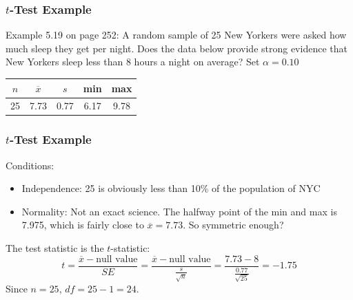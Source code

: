 \documentclass[handout]{beamer}
\newcommand{\blue}[1]{\textcolor{blue2}{#1}}
\newcommand{\xbar}{\overline{x}}
\begin{document}
\begin{frame}
\frametitle{$t$-Test Example}

Example 5.19 on page 252:  A random sample of 25 New Yorkers were asked how much sleep they get per night. Does the data below provide strong evidence that New Yorkers sleep less than 8 hours a night on average?  Set $\alpha=0.10$

\vspace{0.5cm}
\begin{center}
\begin{tabular}{c|c|c|c|c}
$n$ & $\xbar$ & $s$ & min & max\\
\hline
25 & 7.73 & 0.77 & 6.17 & 9.78\\
\end{tabular}
\end{center}

\end{frame}


\begin{frame}
\frametitle{$t$-Test Example}
%
%
Conditions:
\begin{itemize}
\item \blue{Independence}: 25 is obviously less than 10\% of the population of NYC
\item \blue{Normality}: Not an exact science.  The halfway point of the min and max is 7.975, which is fairly close to $\xbar=7.73$.  So symmetric enough? 
\end{itemize}

\vspace{0.25cm}

The test statistic is the $t$-statistic:
\[
t = \frac{\overline{x}-\mbox{null value}}{SE} = \frac{\overline{x}-\mbox{null value}}{\frac{s}{\sqrt n}} = \frac{7.73 - 8}{\frac{0.77}{\sqrt{25}}} = -1.75
\]
Since $n=25$, $df=25-1=24$.
\end{frame}
\end{document}
